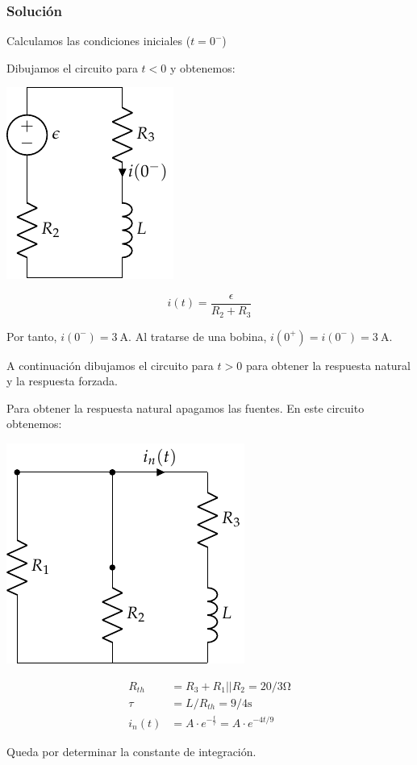 \documentclass[12pt]{article}
\begin{document}
\subsubsection*{Solución}

Calculamos las condiciones iniciales ($t = 0^-$)

Dibujamos el circuito para $t < 0$ y obtenemos:

\begin{minipage}{0.3\textwidth}
  \includegraphics{figs/FM_4_2_t0-}
\end{minipage}
\begin{minipage}{0.7\textwidth}
  \begin{equation*}
    i(t) = \frac{\epsilon}{R_2 + R_3}
  \end{equation*}
\end{minipage}

Por tanto, $i(0^-) = \SI{3}{\ampere}$. Al tratarse de una bobina,
$i(0^+) = i(0^-) = \SI{3}{\ampere}$.

A continuación dibujamos el circuito para $t > 0$ para obtener la
respuesta natural y la respuesta forzada.

Para obtener la respuesta natural apagamos las fuentes. En este
circuito obtenemos:

\begin{minipage}{0.3\textwidth}
  \includegraphics{figs/FM_4_2_natural}
\end{minipage}
\begin{minipage}{0.7\textwidth}
  \begin{align*}
    R_{th} &= R_3 + R_1||R_2 = 20/3\si{\ohm}\\
    \tau &= L/R_{th} = 9/4\si{\second}\\
    i_n(t) &= A \cdot e^{-\frac{t}{\tau}} = A \cdot e^{-4t/9}
  \end{align*}
\end{minipage}
Queda por determinar la constante de integración.
\end{document}
